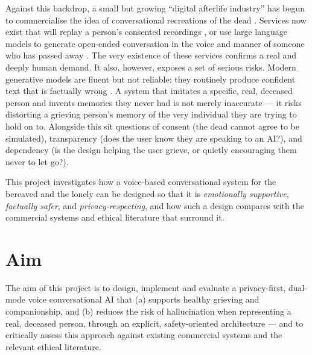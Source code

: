 \documentclass[11pt,a4paper]{report}
\begin{document}
Against this backdrop, a small but growing ``digital afterlife industry'' has begun to commercialise the idea of conversational recreations of the dead \cite{ohman2017political}. Services now exist that will replay a person's consented recordings \cite{hereafter}, or use large language models to generate open-ended conversation in the voice and manner of someone who has passed away \cite{fagone2021jessica,yov}. The very existence of these services confirms a real and deeply human demand. It also, however, exposes a set of serious risks. Modern generative models are fluent but not reliable: they routinely produce confident text that is factually wrong \cite{brown2020language,ji2023survey}. A system that imitates a specific, real, deceased person and invents memories they never had is not merely inaccurate --- it risks distorting a grieving person's memory of the very individual they are trying to hold on to. Alongside this sit questions of consent (the dead cannot agree to be simulated), transparency (does the user know they are speaking to an AI?), and dependency (is the design helping the user grieve, or quietly encouraging them never to let go?).

This project investigates how a voice-based conversational system for the bereaved and the lonely can be designed so that it is \emph{emotionally supportive}, \emph{factually safer}, and \emph{privacy-respecting}, and how such a design compares with the commercial systems and ethical literature that surround it.

\section{Aim}
The aim of this project is to design, implement and evaluate a privacy-first, dual-mode voice conversational AI that (a) supports healthy grieving and companionship, and (b) reduces the risk of hallucination when representing a real, deceased person, through an explicit, safety-oriented architecture --- and to critically assess this approach against existing commercial systems and the relevant ethical literature.
\end{document}
